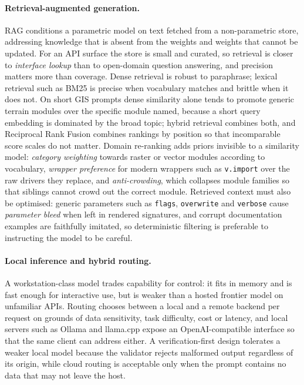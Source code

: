 \paragraph{Retrieval-augmented generation.} RAG \cite{lewis2020rag} conditions a
parametric model on text fetched from a non-parametric store, addressing
knowledge that is absent from the weights and weights that cannot be updated. For an API surface the store is small and
curated, so retrieval is closer to \emph{interface lookup} than to open-domain
question answering, and precision matters more than coverage. Dense retrieval
\cite{karpukhin2020dpr} is robust to paraphrase; lexical retrieval such as BM25
\cite{robertson2009bm25} is precise when vocabulary matches and brittle when it
does not. On short GIS prompts dense similarity alone tends to promote generic
terrain modules over the specific module named, because a short query embedding
is dominated by the broad topic; hybrid retrieval combines both, and Reciprocal
Rank Fusion \cite{cormack2009rrf} combines rankings by position so that
incomparable score scales do not matter. Domain re-ranking adds priors invisible
to a similarity model: \emph{category weighting} towards raster or vector modules
according to vocabulary, \emph{wrapper preference} for modern wrappers such as
\texttt{v.import} over the raw drivers they replace, and \emph{anti-crowding},
which collapses module families so that siblings cannot crowd out the correct
module. Retrieved context must also be optimised: generic parameters such as
\texttt{flags}, \texttt{overwrite} and \texttt{verbose} cause \emph{parameter
bleed} when left in rendered signatures, and corrupt documentation examples are
faithfully imitated, so deterministic filtering is preferable to instructing the
model to be careful.

\paragraph{Local inference and hybrid routing.} A workstation-class model trades
capability for control: it fits in memory and is fast enough for interactive
use, but is weaker than a hosted frontier model on unfamiliar APIs. Routing
chooses between a local and a remote backend per request on grounds of data
sensitivity, task difficulty, cost or latency, and local servers such as Ollama
and llama.cpp expose an OpenAI-compatible interface so that the same client can
address either. A verification-first design tolerates a weaker local model
because the validator rejects malformed output regardless of its origin, while
cloud routing is acceptable only when the prompt contains no data that may not
leave the host.

